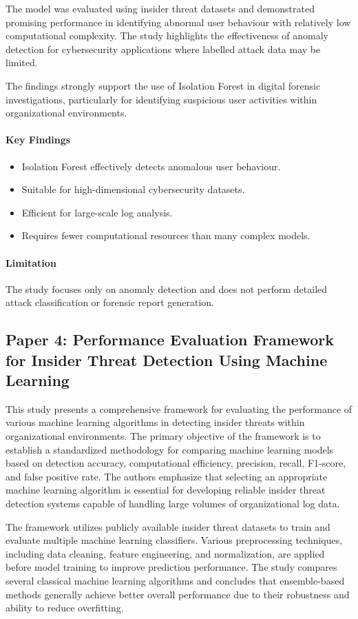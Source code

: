 The model was evaluated using insider threat datasets and demonstrated promising performance in identifying abnormal user behaviour with relatively low computational complexity. The study highlights the effectiveness of anomaly detection for cybersecurity applications where labelled attack data may be limited.

The findings strongly support the use of Isolation Forest in digital forensic investigations, particularly for identifying suspicious user activities within organizational environments.

\paragraph{Key Findings}
\begin{itemize}
  \item Isolation Forest effectively detects anomalous user behaviour.
  \item Suitable for high-dimensional cybersecurity datasets.
  \item Efficient for large-scale log analysis.
  \item Requires fewer computational resources than many complex models.
\end{itemize}
\paragraph{Limitation}
The study focuses only on anomaly detection and does not perform detailed attack classification or forensic report generation.

\subsection*{Paper 4: Performance Evaluation Framework for Insider Threat Detection Using Machine Learning}
This study presents a comprehensive framework for evaluating the performance of various machine learning algorithms in detecting insider threats within organizational environments. The primary objective of the framework is to establish a standardized methodology for comparing machine learning models based on detection accuracy, computational efficiency, precision, recall, F1-score, and false positive rate. The authors emphasize that selecting an appropriate machine learning algorithm is essential for developing reliable insider threat detection systems capable of handling large volumes of organizational log data.

The framework utilizes publicly available insider threat datasets to train and evaluate multiple machine learning classifiers. Various preprocessing techniques, including data cleaning, feature engineering, and normalization, are applied before model training to improve prediction performance. The study compares several classical machine learning algorithms and concludes that ensemble-based methods generally achieve better overall performance due to their robustness and ability to reduce overfitting.

